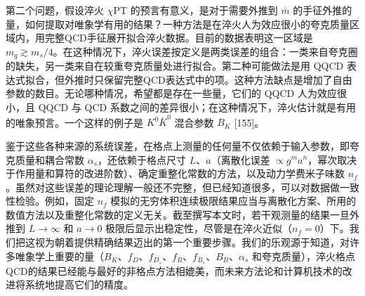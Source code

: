 第二个问题，假设淬火 $\chi$PT 的预言有意义，是对于需要外推到 $\bar{m}$ 的手征外推的量，如何提取对唯象学有用的结果？一种方法是在淬火人为效应很小的夸克质量区域内，用完整QCD手征展开拟合淬火数据。目前的数据表明这一区域是 $m_q \gtrsim m_s/4$。在这种情况下，淬火误差按定义是两类误差的组合：一类来自夸克圈的缺失，另一类来自在较重夸克质量处进行拟合。第二种可能做法是用 QQCD 表达式拟合，但外推时只保留完整QCD表达式中的项。这种方法缺点是增加了自由参数的数目。无论哪种情况，希望都是存在一些量，它们的 QQCD 人为效应很小，且 QQCD 与 QCD 系数之间的差异很小；在这种情况下，淬火估计就是有用的唯象预言。一个这样的例子是 $K^0\bar{K}^0$ 混合参数 $B_K$ [155]。

鉴于这些各种来源的系统误差，在格点上测量的任何量不仅依赖于输入参数，即夸克质量和耦合常数 $\alpha_s$，还依赖于格点尺寸 $L$、$a$（离散化误差 $\propto g^m a^n$，幂次取决于作用量和算符的改进阶数）、确定重整化常数的方法，以及动力学费米子味数 $n_f$。虽然对这些误差的理论理解一般还不完整，但已经知道很多，可以对数据做一致性检验。例如，固定 $n_f$ 模拟的无穷体积连续极限结果应当与离散化方案、所用的数值方法以及重整化常数的定义无关。截至撰写本文时，若干观测量的结果一旦外推到 $L \to \infty$ 和 $a \to 0$ 极限后显示出稳定性，尽管是在淬火近似（$n_f = 0$）下。我们把这视为朝着提供精确结果迈出的第一个重要步骤。我们的乐观源于知道，对许多唯象学上重要的量（$B_K$、$f_D$、$f_{D_s}$、$f_B$、$f_{B_s}$、$B_B$、$\alpha_s$ 和夸克质量），淬火格点QCD的结果已经能与最好的非格点方法相媲美，而未来方法论和计算机技术的改进将系统地提高它们的精度。

